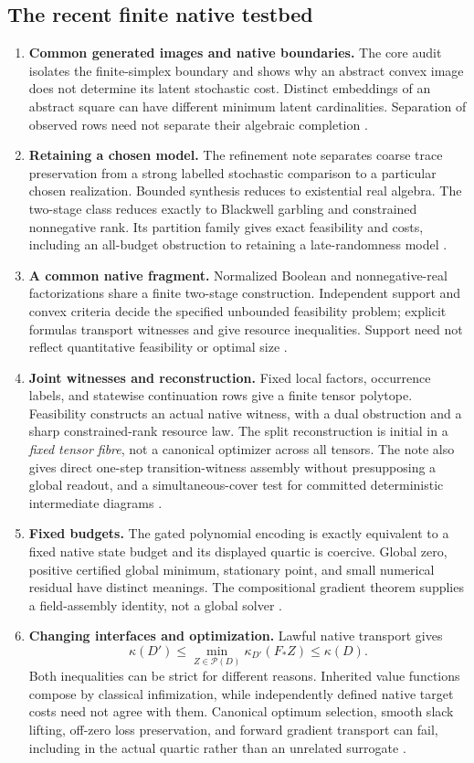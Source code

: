 \documentclass[11pt]{article}
\theoremstyle{remark}
\newcommand{\calP}{\mathcal P}
\begin{document}
\subsection{The recent finite native testbed}

\begin{enumerate}
\item \textbf{Common generated images and native boundaries.} The core audit isolates the finite-simplex boundary and shows why an abstract convex image does not determine its latent stochastic cost. Distinct embeddings of an abstract square can have different minimum latent cardinalities. Separation of observed rows need not separate their algebraic completion \cite{Core}.
\item \textbf{Retaining a chosen model.} The refinement note separates coarse trace preservation from a strong labelled stochastic comparison to a particular chosen realization. Bounded synthesis reduces to existential real algebra. The two-stage class reduces exactly to Blackwell garbling and constrained nonnegative rank. Its partition family gives exact feasibility and costs, including an all-budget obstruction to retaining a late-randomness model \cite{Refinement}.
\item \textbf{A common native fragment.} Normalized Boolean and nonnegative-real factorizations share a finite two-stage construction. Independent support and convex criteria decide the specified unbounded feasibility problem; explicit formulas transport witnesses and give resource inequalities. Support need not reflect quantitative feasibility or optimal size \cite{Common}.
\item \textbf{Joint witnesses and reconstruction.} Fixed local factors, occurrence labels, and statewise continuation rows give a finite tensor polytope. Feasibility constructs an actual native witness, with a dual obstruction and a sharp constrained-rank resource law. The split reconstruction is initial in a \emph{fixed tensor fibre}, not a canonical optimizer across all tensors. The note also gives direct one-step transition-witness assembly without presupposing a global readout, and a simultaneous-cover test for committed deterministic intermediate diagrams \cite{Joint}.
\item \textbf{Fixed budgets.} The gated polynomial encoding is exactly equivalent to a fixed native state budget and its displayed quartic is coercive. Global zero, positive certified global minimum, stationary point, and small numerical residual have distinct meanings. The compositional gradient theorem supplies a field-assembly identity, not a global solver \cite{Budget}.
\item \textbf{Changing interfaces and optimization.} Lawful native transport gives
\[
 \kappa(D')\leq \min_{Z\in\calP(D)}\kappa_{D'}(F_*Z)\leq\kappa(D).
\]
Both inequalities can be strict for different reasons. Inherited value functions compose by classical infimization, while independently defined native target costs need not agree with them. Canonical optimum selection, smooth slack lifting, off-zero loss preservation, and forward gradient transport can fail, including in the actual quartic rather than an unrelated surrogate \cite{Interface}.
\end{enumerate}
\end{document}
